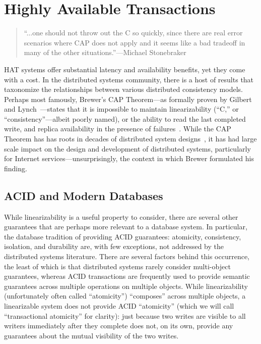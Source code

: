 
\section{Highly Available Transactions}
\label{sec:hats}

\begin{quote}
``...one should not throw out the C so quickly, since there are real
  error scenarios where CAP does not apply and it seems like a bad
  tradeoff in many of the other situations.''---Michael
  Stonebraker~\cite{stonebraker2010errors}
\end{quote}

HAT systems offer substantial latency and availability benefits, yet
they come with a cost. In the distributed systems community, there is
a host of results that taxonomize the relationships between various
distributed consistency models. Perhaps most famously, Brewer's CAP
Theorem---as formally proven by Gilbert and
Lynch~\cite{needed}---states that it is impossible to maintain
linearizability (``C,'' or ``consistency''---albeit poorly named), or
the ability to read the last completed write, and replica availability
in the presence of failures~\cite{needed}. While the CAP Theorem has
has roots in decades of distributed system designs~\cite{needed}, it
has had large scale impact on the design and development of
distributed systems, particularly for Internet
services---unsurprisingly, the context in which Brewer formulated his
finding.

\subsection{ACID and Modern Databases}

While linearizability is a useful property to consider, there are
several other guarantees that are perhaps more relevant to a database
system. In particular, the database tradition of providing ACID
guarantees: atomicity, consistency, isolation, and durability are,
with few exceptions, not addressed by the distributed systems
literature. There are several factors behind this occurrence, the
least of which is that distributed systems rarely consider
multi-object guarantees, whereas ACID transactions are frequently used
to provide semantic guarantees across multiple operations on multiple
objects. While linearizability (unfortunately often called
``atomicity'') ``composes'' across multiple objects, a linearizable
system does not provide ACID ``atomicity'' (which we will call
``transactional atomicity'' for clarity): just because two writes are
visible to all writers immediately after they complete does not, on
its own, provide any guarantees about the mutual visibility of the two
writes.

